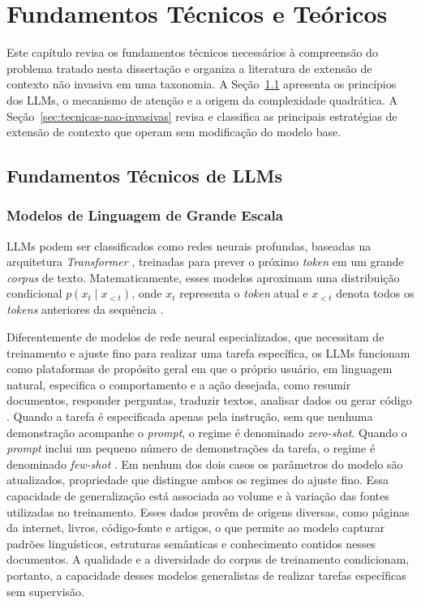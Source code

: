 \chapter{Fundamentos Técnicos e Teóricos}
\label{cap:fundamentos}

Este capítulo revisa os fundamentos técnicos necessários à compreensão do problema tratado nesta dissertação e organiza a literatura de extensão de contexto não invasiva em uma taxonomia. A Seção~\ref{sec:fundamentos-llms} apresenta os princípios dos LLMs, o mecanismo de atenção e a origem da complexidade quadrática. A Seção~\ref{sec:tecnicas-nao-invasivas} revisa e classifica as principais estratégias de extensão de contexto que operam sem modificação do modelo base.

\section{Fundamentos Técnicos de LLMs}
\label{sec:fundamentos-llms}

\subsection{Modelos de Linguagem de Grande Escala}
\label{subsec:llms}

LLMs podem ser classificados como redes neurais profundas, baseadas na arquitetura \textit{Transformer} \cite{vaswani2017attention}, treinadas para prever o próximo \textit{token} em um grande \textit{corpus} de texto. Matematicamente, esses modelos aproximam uma distribuição condicional $p(x_t \mid x_{<t})$, onde $x_t$ representa o \textit{token} atual e $x_{<t}$ denota todos os \textit{tokens} anteriores da sequência \cite{vaswani2017attention,brown2020fewshot}.

Diferentemente de modelos de rede neural especializados, que necessitam de treinamento e ajuste fino para realizar uma tarefa específica, os LLMs funcionam como plataformas de propósito geral em que o próprio usuário, em linguagem natural, especifica o comportamento e a ação desejada, como resumir documentos, responder perguntas, traduzir textos, analisar dados ou gerar código \cite{brown2020fewshot,huynh2025codegen,zhao2023survey}. Quando a tarefa é especificada apenas pela instrução, sem que nenhuma demonstração acompanhe o \textit{prompt}, o regime é denominado \textit{zero-shot}. Quando o \textit{prompt} inclui um pequeno número de demonstrações da tarefa, o regime é denominado \textit{few-shot} \cite{brown2020fewshot}. Em nenhum dos dois casos os parâmetros do modelo são atualizados, propriedade que distingue ambos os regimes do ajuste fino. Essa capacidade de generalização está associada ao volume e à variação das fontes utilizadas no treinamento. Esses dados provêm de origens diversas, como páginas da internet, livros, código-fonte e artigos, o que permite ao modelo capturar padrões linguísticos, estruturas semânticas e conhecimento contidos nesses documentos. A qualidade e a diversidade do corpus de treinamento condicionam, portanto, a capacidade desses modelos generalistas de realizar tarefas específicas sem supervisão.

